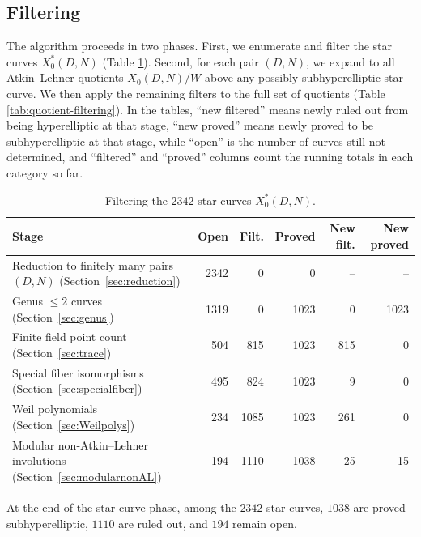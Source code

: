 \documentclass[12pt]{amsart}
\numberwithin{equation}{subsection}
\theoremstyle{plain}\newtheorem{ithm}{Theorem}
\theoremstyle{plain}\newtheorem{iprop}[ithm]{Proposition}
\theoremstyle{definition}
\theoremstyle{remark}
\newcommand{\Curve}[2]{X_0({#1},{#2})} %
\newcommand{\StarCurve}[2]{X_0^*({#1},{#2})} %
\begin{document}
\subsection{Filtering}
The algorithm proceeds in two phases.  
First, we enumerate and filter the star curves $\StarCurve{D}{N}$ (Table \ref{tab:star-curve-filtering}).  
Second, for each pair $(D,N)$, we expand to all Atkin--Lehner quotients $\Curve{D}{N}/W$ above any possibly subhyperelliptic star curve. We then apply the remaining filters to the full set of quotients (Table \ref{tab:quotient-filtering}).  
In the tables, ``new filtered'' means newly ruled out from being hyperelliptic at that stage, ``new proved'' means newly proved to be subhyperelliptic at that stage, while ``open'' is the number of curves  still not determined, and ``filtered'' and ``proved'' columns count the running totals in each category so far.
\begin{table}[ht]
\centering
\small
 \renewcommand{\arraystretch}{1.15}
  \setlength{\tabcolsep}{3pt}
\begin{tabularx}{\textwidth}{Xrrrrr}
\hline
Stage & Open & Filt. & Proved & New filt. & New proved \\
\hline
Reduction to finitely many pairs $(D,N)$ (Section~\ref{sec:reduction})
& 2342 & 0 & 0 & -- & -- \\
Genus $\leq 2$ curves (Section~\ref{sec:genus})
& 1319 & 0 & 1023 & 0 & 1023 \\
Finite field point count (Section~\ref{sec:trace})
& 504 & 815 & 1023 & 815 & 0 \\
Special fiber isomorphisms (Section~\ref{sec:specialfiber})
& 495 & 824 & 1023 & 9 & 0 \\
Weil polynomials (Section~\ref{sec:Weilpolys})
& 234 & 1085 & 1023 & 261 & 0 \\
Modular non-Atkin--Lehner involutions (Section~\ref{sec:modularnonAL})
& 194 & 1110 & 1038 & 25 & 15 \\
\hline
\end{tabularx}
\caption{Filtering the $2342$ star curves $\StarCurve{D}{N}$.}
\label{tab:star-curve-filtering}
\end{table}

At the end of the star curve phase, among the $2342$ star curves, $1038$ are
proved subhyperelliptic, $1110$ are ruled out, and $194$ remain open.  
\end{document}
